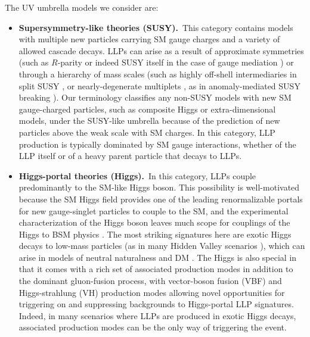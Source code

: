 The UV umbrella models we consider are:
%
\begin{itemize}

\item {\bf Supersymmetry-like theories (SUSY).}~This category contains models
  with multiple new particles carrying SM gauge charges and a variety
  of allowed cascade decays. LLPs can arise as a result of approximate
  symmetries (such as $R$-parity \cite{Barbier:2004ez} or indeed SUSY itself in the case
  of gauge mediation \cite{Dimopoulos:1996vz}) or through a hierarchy of mass scales (such as
  highly off-shell intermediaries in split SUSY \cite{ArkaniHamed:2004fb}, or
  nearly-degenerate multiplets \cite{Chen:1995yu,Thomas:1998wy,Byrne:2003sa}, as in anomaly-mediated SUSY breaking \cite{Feng:1999fu}).  Our terminology
  classifies any non-SUSY models with new SM gauge-charged particles, such
  as composite Higgs or extra-dimensional models, under the SUSY-like
  umbrella because of the prediction of new particles above the weak scale with SM charges.  In this category, LLP production is typically dominated by
  SM gauge interactions, whether of the LLP itself or of a heavy
  parent particle that decays to LLPs.

\item {\bf Higgs-portal theories (Higgs).}~In this category, LLPs couple predominantly to the SM-like Higgs boson.  This possibility is well-motivated because the SM Higgs field provides one of the leading renormalizable portals for new gauge-singlet particles to couple to the SM, and the experimental characterization of the Higgs boson leaves much scope for couplings of the Higgs to BSM physics \cite{Khachatryan:2014jba,Aad:2015pla}.  The most striking signatures here are exotic Higgs decays  to low-mass particles  \cite{Curtin:2013fra} (as in many Hidden Valley scenarios \cite{Strassler:2006im,Strassler:2006ri}), which can arise in models of neutral naturalness \cite{Chacko:2005pe,Burdman:2006tz,Craig:2015pha} and DM \cite{Silveira:1985rk}.  
The Higgs is also special in that it comes with a rich set of associated production modes in addition to the dominant gluon-fusion process, with vector-boson fusion (VBF) and Higgs-strahlung (VH) production modes allowing novel opportunities for triggering on and suppressing backgrounds to Higgs-portal LLP signatures. Indeed, in many scenarios where LLPs are produced in exotic Higgs decays, associated production modes can be the only way of triggering the event.


\end{itemize}
